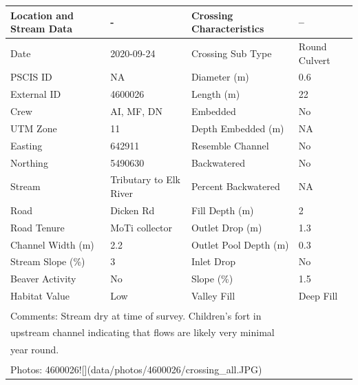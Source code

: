 \documentclass[
]{book}
\begin{document}
\begin{tabular}{l|l|l|l}
\hline
Location and Stream Data & - & Crossing Characteristics & --\\
\hline
Date & 2020-09-24 & Crossing Sub Type & Round Culvert\\
\hline
PSCIS ID & NA & Diameter (m) & 0.6\\
\hline
External ID & 4600026 & Length (m) & 22\\
\hline
Crew & AI, MF, DN & Embedded & No\\
\hline
UTM Zone & 11 & Depth Embedded (m) & NA\\
\hline
Easting & 642911 & Resemble Channel & No\\
\hline
Northing & 5490630 & Backwatered & No\\
\hline
Stream & Tributary to Elk River & Percent Backwatered & NA\\
\hline
Road & Dicken Rd & Fill Depth (m) & 2\\
\hline
Road Tenure & MoTi collector & Outlet Drop (m) & 1.3\\
\hline
Channel Width (m) & 2.2 & Outlet Pool Depth (m) & 0.3\\
\hline
Stream Slope (\%) & 3 & Inlet Drop & No\\
\hline
Beaver Activity & No & Slope (\%) & 1.5\\
\hline
Habitat Value & Low & Valley Fill & Deep Fill\\
\hline
\multicolumn{4}{l}{\textsuperscript{} Comments: Stream dry at time of survey.  Children’s fort in}\\
\multicolumn{4}{l}{upstream channel indicating that flows are likely very minimal}\\
\multicolumn{4}{l}{year round.}\\
\multicolumn{4}{l}{\textsuperscript{} Photos: 4600026![](data/photos/4600026/crossing\_all.JPG)}\\
\end{tabular}
\end{document}
